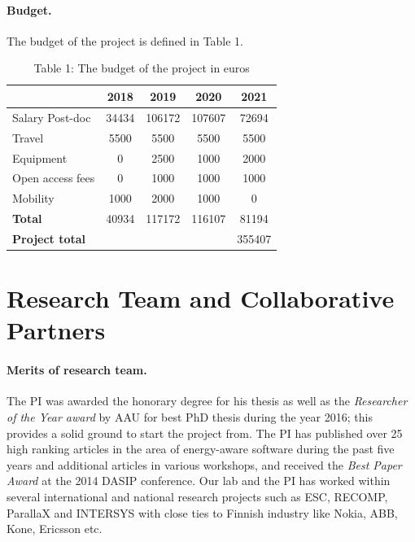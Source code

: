 \documentclass{article}
\begin{document}
\paragraph{Budget.}
The budget of the project is defined in Table 1.\\
\begin{table}
\vspace{-1.3cm}
\small
\begin{tabular}{ | l | c | c |c |c |}
\hline
& {\textbf{2018}} & {\textbf{2019}} & {\textbf{2020}} & {\textbf{2021}} \\ \hline
{Salary Post-doc} 	& 34434 & 106172 & 107607 & 72694 \\ \hline
{Travel} 			& 5500 	& 5500 	& 5500 	& 5500  \\ \hline
{Equipment} 		& 0 	& 2500 	& 1000 	& 2000  \\ \hline
{Open access fees} 	& 0 	& 1000 	& 1000 	& 1000  \\ \hline
{Mobility} 			& 1000 	& 2000 	& 1000 	& 0  \\ \hline
{\textbf{Total}} 	& 40934 & 117172	& 116107 	& 81194  \\ \hline
{\textbf{Project total}} 	&  & 	&  	& 355407  \\ \hline
\end{tabular}
\caption*{Table 1: The budget of the project in euros}
\label{tab:budget}
\vspace{-1.5cm}
\end{table}

\section{Research Team and Collaborative Partners}
\paragraph{Merits of research team.}
The PI was awarded the honorary degree for his thesis as well as the \textit{Researcher of the Year award} by AAU for best PhD thesis during the year 2016; this provides a solid ground to start the project from.
The PI has published over 25 high ranking articles in the area of energy-aware software during the past five years and additional articles in various workshops, 
and received the \textit{Best Paper Award} at the 2014 DASIP conference.
Our lab and the PI has worked within several international and national research projects such as ESC, RECOMP, ParallaX and INTERSYS with close ties to Finnish industry like Nokia, ABB, Kone, Ericsson etc.
\end{document}
